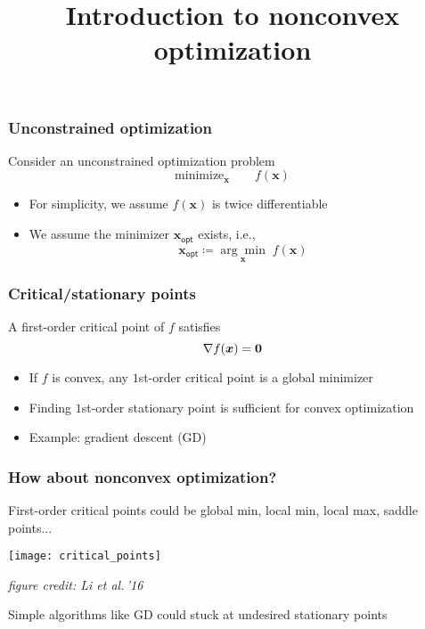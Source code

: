 \documentclass[compress,
mathserif,wide,%
]{beamer}
\title %
{Introduction to nonconvex optimization}
\begin{document}
\begin{frame}[plain]
  \titlepage

\end{frame}

\begin{frame}
	\frametitle{Unconstrained optimization}
	Consider an unconstrained optimization problem
\[
	\text{minimize}_{\bm{x}}\qquad f(\bm{x})
\]

\vfill

\begin{itemize}
\item For simplicity, we assume $f(\bm{x})$ is twice differentiable
\item We assume the minimizer $\bm{x}_{\mathsf{opt}}$ exists, i.e., 
\[
\bm{x}_{\mathsf{opt}} \coloneqq \underset{\bm{x}}{\arg\min} \; f(\bm{x})
\]
\end{itemize}

\end{frame}

\begin{frame}
	\frametitle{Critical/stationary points}
	\begin{definition}
A first-order critical point  of $f$ satisfies
	$$ \nabla f({\bm x}) = \bm{0} $$ 
\end{definition} 

\vfill

\begin{itemize}
	\item If $f$ is convex, any $1$st-order critical point is a global minimizer
	\item Finding $1$st-order stationary point is sufficient for convex optimization
	\item Example: gradient descent (GD)
\end{itemize}
\end{frame}


\begin{frame}
	\frametitle{How about nonconvex optimization?}
	First-order critical points could be global min, local min, local max, saddle points...
	
	\vfill
	 \begin{center}
\texttt{[image: critical\_points]}
\end{center}
\hfill {\em\footnotesize figure credit: Li et al.\,'16}

\vfill
{

\begin{varblock}[\textwidth]{}
Simple algorithms like GD could stuck at undesired stationary points
\end{varblock}
}


\end{frame}
\end{document}
